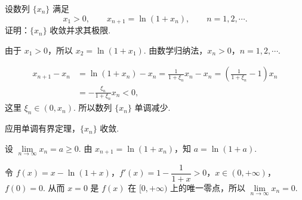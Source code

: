 设数列 $\{x_n\}$ 满足
\[
  x_1>0,\qquad x_{n+1}=\ln(1+x_n),\qquad n=1,2,\cdots.
\]
证明：$\{x_n\}$ 收敛并求其极限.
\begin{solution}
由于 $x_1>0$，所以 $x_2=\ln(1+x_1)$. 由数学归纳法，$x_n>0$，$n=1,2,\cdots$.

\begin{align*}
x_{n+1}-x_n&=\ln(1+x_n)-x_n=\frac{1}{1+\xi_n}x_n-x_n=\left(\frac{1}{1+\xi_n}-1\right)x_n\\
&=-\frac{\xi_n}{1+\xi_n}x_n<0,
\end{align*}
这里 $\xi_n\in(0,x_n)$. 所以数列 $\{x_n\}$ 单调减少.

应用单调有界定理，$\{x_n\}$ 收敛.

设 $\lim\limits_{n\to\infty}x_n=a\ge0$. 由 $x_{n+1}=\ln(1+x_n)$，知 $a=\ln(1+a)$.

令 $f(x)=x-\ln(1+x)$，$f'(x)=1-\dfrac{1}{1+x}>0$，$x\in(0,+\infty)$，$f(0)=0$. 从而 $x=0$ 是 $f(x)$ 在 $[0,+\infty)$ 上的唯一零点，所以 $\lim\limits_{n\to\infty}x_n=0$.
\end{solution}

